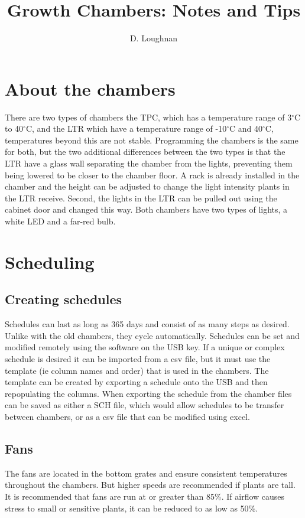 \documentclass[11pt,a4paper,oneside]{article}
\title{Growth Chambers: Notes and Tips} %
\author{D. Loughnan}
\begin{document}
\maketitle

\section{About the chambers}

\par There are two types of chambers the TPC, which has a temperature range of 3$^\circ$C to 40$^\circ$C, and the LTR which have a temperature range of -10$^\circ$C and 40$^\circ$C, temperatures beyond this are not stable. Programming the chambers is the same for both, but the two additional differences between the two types is that the LTR have a glass wall separating the chamber from the lights, preventing them being lowered to be closer to the chamber floor. A rack is already installed in the chamber and the height can be adjusted to change the light intensity plants in the LTR receive. Second, the lights in the LTR can be pulled out using the cabinet door and changed this way. Both chambers have two types of lights, a white LED and a far-red bulb. 
\section{Scheduling}

\subsection{Creating schedules}
\par Schedules can last as long as 365 days and consist of as many steps as desired. Unlike with the old chambers, they cycle automatically. Schedules can be set and modified remotely using the software on the USB key. If a unique or complex schedule is desired it can be imported from a csv file, but it must use the template (ie column names and order) that is used in the chambers. The template can be created by exporting a schedule onto the USB and then repopulating the columns. When exporting the schedule from the chamber files can be saved as either a SCH file, which would allow schedules to be transfer between chambers, or as a csv file that can be modified using excel. 

\subsection{Fans}
\par The fans are located in the bottom grates and ensure consistent temperatures throughout the chambers. But higher speeds are recommended if plants are tall. It is recommended that fans are run at or greater than 85\%. If airflow causes stress to small or sensitive plants, it can be reduced to as low as 50\%.
\end{document}
